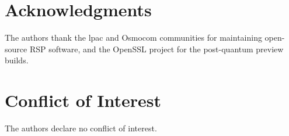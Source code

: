 \documentclass[final,3p,times,twocolumn]{elsarticle}
\begin{document}
\section*{Acknowledgments}

The authors thank the lpac and Osmocom communities for maintaining open-source
RSP software, and the OpenSSL project for the post-quantum preview builds.

\section*{Conflict of Interest}
The authors declare no conflict of interest.



\end{document}

